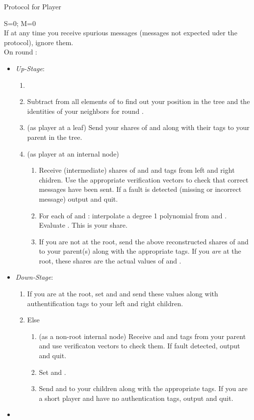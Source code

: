 \documentclass[12pt]{article}
\theoremstyle{definition}
\newcommand{\upStage}{\emph{Up-Stage}\xspace}
\newcommand{\downStage}{\emph{Down-Stage}\xspace}
\begin{document}
\begin{algorithm} 
\caption{Protocol for Player } \label{alg:Player} 
S=0; M=0 \\
If at any time you receive spurious messages (messages not expected uder the 
protocol), ignore them. \\
On round :
\begin{itemize}
\item[] \upStage:
\begin{enumerate}
\item 
\item Subtract  from all elements of  to find out your position 
in the tree and the identities of your neighbors for round .
\item (as player at a leaf) Send your shares of  and  along with 
their tags to your parent in the tree.
\item (as player at an internal node) 
\begin{enumerate}
\item Receive (intermediate) shares of  and  and tags from 
left and right chidren. Use the 
appropriate verification vectors to check that correct messages have been sent.
If a fault is detected (missing or incorrect message) output  and quit.
\item For each of  and : interpolate a degree 1 polynomial  
from  and . 
Evaluate . This is your share.
\item If you are not at the root, send the above reconstructed shares of  
and  to your parent(s) along with the appropriate tags. If you 
\emph{are} at the root, these shares are the actual values of  and 
.
\end{enumerate}
\end{enumerate}
\item[] \downStage:
\begin{enumerate}
\item If you are at the root, set  and  and send these 
values along with authentification tags to your left and right children.
\item Else
\begin{enumerate}
\item (as a non-root internal node) Receive  and  and tags from 
your parent and use verificaton vectors to check them. If fault detected, 
output  and quit.
\item Set  and .
\item Send  and  to your children along with the appropriate tags.
If you are a short player and have no authentication tags, output  and 
quit.
\end{enumerate}
\end{enumerate}
\item[] 
\end{itemize}
\end{algorithm}
\end{document}
